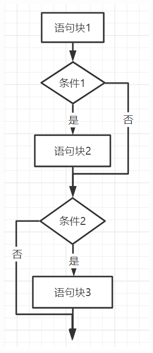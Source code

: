 \documentclass[10pt, a4paper]{article}
\begin{document}
\begin{figure}[htbp]
\begin{minipage}[t]{.29\textwidth}
\begin{minipage}[t]{.45\textwidth}
                \includegraphics[width=\textwidth]{26-1.png}

\end{minipage}
\end{minipage}
\end{figure}
\end{document}
